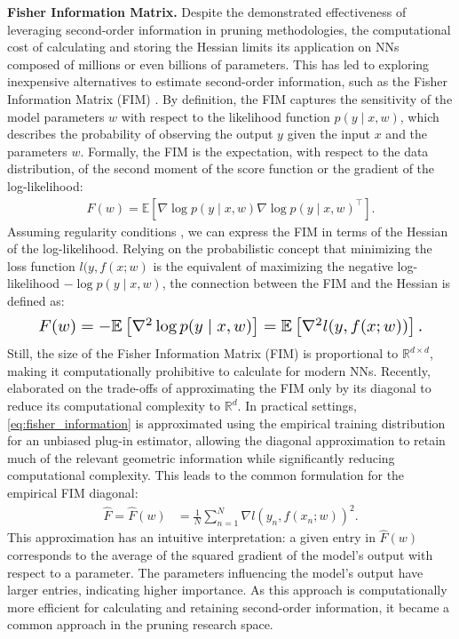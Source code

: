 \textbf{Fisher Information Matrix.} Despite the demonstrated effectiveness of leveraging second-order information in pruning methodologies, the computational cost of calculating and storing the Hessian limits its application on NNs composed of millions or even billions of parameters. This has led to exploring inexpensive alternatives to estimate second-order information, such as the Fisher Information Matrix (FIM) \cite{vacar2011langevin}. By definition, the FIM captures the sensitivity of the model parameters \(w\) with respect to the likelihood function \(p(y \mid x, w)\), which describes the probability of observing the output \(y\) given the input \(x\) and the parameters \(w\). Formally, the FIM is the expectation, with respect to the data distribution, of the second moment of the score function or the gradient of the log-likelihood:
\begin{align}
    F(w) = \mathbb{E} \left[ 
        \nabla \log p(y \mid x, w)
        \nabla \log p(y \mid x, w)^\top
    \right].
    \label{eq:fisher_information}
\end{align}
Assuming regularity conditions \cite{Schervish2012-xv}, we can express the FIM in terms of the Hessian of the log-likelihood. Relying on the probabilistic concept that minimizing the loss function $l(y, f(x;w)$ is the equivalent of maximizing the negative log-likelihood $- \log p(y \mid x, w)$, the connection between the FIM and the Hessian is defined as:
\begin{align}
    \resizebox{.9\hsize}{!}{$
        F(w) = - \mathbb{E} \left[ 
            \nabla^2 \log p(y \mid x, w)
        \right]
        =\mathbb{E} \left[ 
            \nabla^2 l(y, f(x;w))
        \right]
        .
    $}
    \label{eq:fisher_information_hessian}
\end{align}
Still, the size of the Fisher Information Matrix (FIM) is proportional to \(\mathbb{R}^{d \times d}\), making it computationally prohibitive to calculate for modern NNs. Recently, \citet{soen2024tradeoffs} elaborated on the trade-offs of approximating the FIM only by its diagonal to reduce its computational complexity to \(\mathbb{R}^d\). In practical settings, \eqref{eq:fisher_information} is approximated using the empirical training distribution for an unbiased plug-in estimator, allowing the diagonal approximation to retain much of the relevant geometric information while significantly reducing computational complexity. This leads to the common formulation for the empirical FIM diagonal:
\begin{align}
    \label{eq:empirical_fim_diag}
    \hat{F} = \hat{F}(w)
    &= 
    \frac{1}{N} \sum_{n=1}^N 
    \nabla l(y_n, f(x_n;w))^2.
\end{align}
This approximation has an intuitive interpretation: a given entry in \(\hat{F}(w)\) corresponds to the average of the squared gradient of the model's output with respect to a parameter. The parameters influencing the model's output have larger entries, indicating higher importance. As this approach is computationally more efficient for calculating and retaining second-order information, it became a common approach in the pruning research space.

